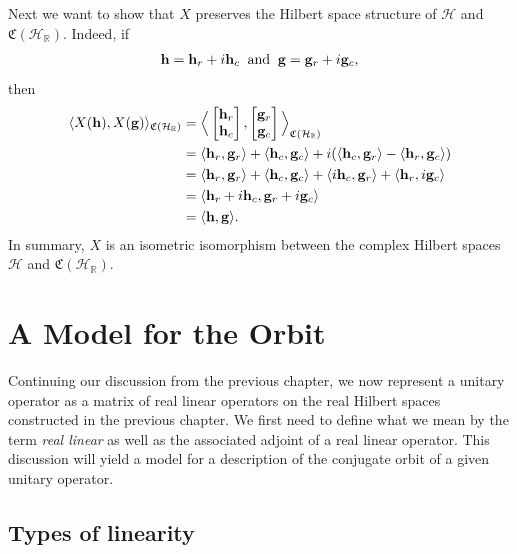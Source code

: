 \documentclass{dis}
\theoremstyle{plain}
\theoremstyle{definition}
\def\R{\mathbb{R}}
\renewcommand{\vec}[1]{{\bf #1}}
\newcommand{\0}{{\color{lightgray}0}}
\begin{document}
Next we want to show that $X$ preserves the Hilbert space structure of $\mathcal{H}$ and $\mathfrak{C}(\mathcal{H}_{\R})$. Indeed, if
$$\vec{h} = \vec{h}_{r} + i  \vec{h}_{c} \; \; \mbox{and} \; \;  \vec{g} = \vec{g}_{r} + i \vec{g}_{c},$$ then
\begin{align*}
\langle X(\vec{h}), X(\vec{g})\rangle_{\mathfrak{C}(\mathcal{H}_{\R})} & = \Big\langle  \begin{bmatrix}\vec{h}_{r}\\ \vec{h}_c\end{bmatrix}, \begin{bmatrix}\vec{g}_{r}\\\vec{g}_{c}\end{bmatrix}\Big\rangle_{\mathfrak{C}(\mathcal{H}_{\R})}\\
& = \langle \vec{h}_{r}, \vec{g}_{r}\rangle + \langle \vec{h}_{c}, \vec{g}_{c}\rangle + i (\langle \vec{h}_{c}, \vec{g}_{r}\rangle - \langle \vec{h}_{r}, \vec{g}_{c}\rangle)\\
& = \langle \vec{h}_{r}, \vec{g}_{r}\rangle + \langle \vec{h}_{c}, \vec{g}_{c}\rangle + \langle i \vec{h}_c, \vec{g}_{r}\rangle + \langle \vec{h}_{r}, i \vec{g}_{c}\rangle\\
& = \langle \vec{h}_{r} + i \vec{h}_{c}, \vec{g}_{r} + i \vec{g}_{c}\rangle\\
& = \langle \vec{h}, \vec{g}\rangle.
\end{align*}
In summary, $X$ is an isometric isomorphism between the complex Hilbert spaces $\mathcal{H}$ and $\mathfrak{C}(\mathcal{H}_{\R})$.





\chapter{A Model for the Orbit}

Continuing our discussion from the previous chapter, we now represent a unitary operator as a matrix of real linear operators on the real Hilbert spaces constructed in the previous chapter. We first need to define what we mean by the term {\em real linear} as well as the associated adjoint of a real linear operator. This discussion will yield a model for a description of the conjugate orbit of a given unitary operator. 

\section{Types of linearity}
\end{document}
